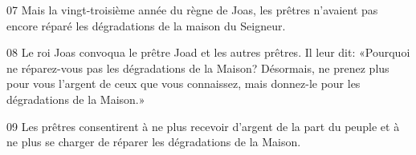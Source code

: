 
07 Mais la vingt-troisième année du règne de Joas, les prêtres n’avaient pas encore réparé les dégradations de la maison du Seigneur.

08 Le roi Joas convoqua le prêtre Joad et les autres prêtres. Il leur dit: «Pourquoi ne réparez-vous pas les dégradations de la Maison? Désormais, ne prenez plus pour vous l’argent de ceux que vous connaissez, mais donnez-le pour les dégradations de la Maison.»

09 Les prêtres consentirent à ne plus recevoir d’argent de la part du peuple et à ne plus se charger de réparer les dégradations de la Maison.

